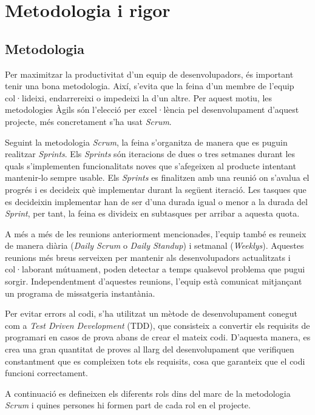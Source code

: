 \section{Metodologia i rigor}

\subsection{Metodologia}
Per maximitzar la productivitat d'un equip de desenvolupadors, és important tenir una bona metodologia. Així, s'evita que la feina d'un membre de l'equip col·lideixi, endarrereixi o impedeixi la d'un altre. Per aquest motiu, les metodologies Àgils són l'elecció per excel·lència pel desenvolupament d'aquest projecte, més concretament s'ha usat \textit{Scrum}.

Seguint la metodologia \textit{Scrum}, la feina s'organitza de manera que es puguin realitzar \textit{Sprints}. Els \textit{Sprints} són iteracions de dues o tres setmanes durant les quals s'implementen funcionalitats noves que s'afegeixen al producte intentant mantenir-lo sempre usable. Els \textit{Sprints} es finalitzen amb una reunió on s'avalua el progrés i es decideix què implementar durant la següent iteració. Les tasques que es decideixin implementar han de ser d'una durada igual o menor a la durada del \textit{Sprint}, per tant, la feina es divideix en subtasques per arribar a aquesta quota.

A més a més de les reunions anteriorment mencionades, l'equip també es reuneix de manera diària (\textit{Daily Scrum} o \textit{Daily Standup}) i setmanal (\textit{Weeklys}). Aquestes reunions més breus serveixen per mantenir als desenvolupadors actualitzats i col·laborant mútuament, poden detectar a temps qualsevol problema que pugui sorgir. Independentment d'aquestes reunions, l'equip està comunicat mitjançant un programa de missatgeria instantània.

Per evitar errors al codi, s'ha utilitzat un mètode de desenvolupament conegut com a \textit{Test Driven Development} (TDD), que consisteix a convertir els requisits de programari en casos de prova abans de crear el mateix codi. D'aquesta manera, es crea una gran quantitat de proves al llarg del desenvolupament que verifiquen constantment que es compleixen tots els requisits, cosa que garanteix que el codi funcioni correctament.

A continuació es defineixen els diferents rols dins del marc de la metodologia \textit{Scrum} \cite{scrum} i quines persones hi formen part de cada rol en el projecte.


